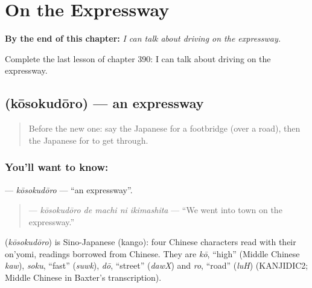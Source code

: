 
\chapter{On the Expressway}
\label{ch:ja-on-the-expressway}

\begin{chapteropening}
\textbf{By the end of this chapter:} \emph{I can talk about driving on the expressway.}

Complete the last lesson of chapter 390: I can talk about driving on the expressway.
\end{chapteropening}

\section[\texorpdfstring{\ja{こうそくどうろ} (kōsokudōro)}{こうそくどうろ (kōsokudōro)}]{ (kōsokudōro) — an expressway}

\label{lesson:JA-C390-kousokudouro}



\begin{quote}
Before the new one: say the Japanese for a footbridge (over a road), then the Japanese for to get through.
\end{quote}

\subsection*{You'll want to know: }
\textbf{} — \emph{kōsokudōro} — \textquotedblleft{}an expressway\textquotedblright{}.

\begin{quote}
\textbf{  } — \emph{kōsokudōro de machi ni ikimashita} — \textquotedblleft{}We went into town on the expressway.\textquotedblright{}
\end{quote}

\begin{cousinweb}
\textbf{} (\emph{kōsokudōro}) is Sino-Japanese (kango): four Chinese characters read with their on'yomi, readings borrowed from Chinese. They are \emph{kō}, \textquotedblleft{}high\textquotedblright{} (Middle Chinese \emph{kaw}), \emph{soku}, \textquotedblleft{}fast\textquotedblright{} (\emph{suwk}), \emph{dō}, \textquotedblleft{}street\textquotedblright{} (\emph{dawX}) and \emph{ro}, \textquotedblleft{}road\textquotedblright{} (\emph{luH}) (KANJIDIC2; Middle Chinese in Baxter's transcription).
\end{cousinweb}


